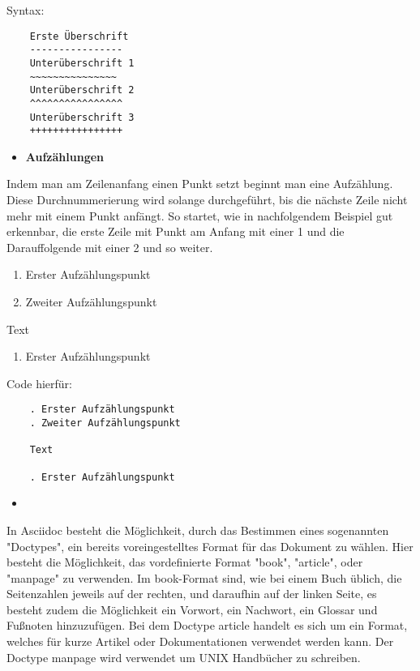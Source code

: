 \documentclass[11pt]{amsbook}
\begin{document}
Syntax:


\begin{verbatim}
    Erste Überschrift
    ----------------
    Unterüberschrift 1
    ~~~~~~~~~~~~~~~
    Unterüberschrift 2
    ^^^^^^^^^^^^^^^^
    Unterüberschrift 3
    ++++++++++++++++
\end{verbatim}

\begin{itemize}

\item \textbf{Aufzählungen}

\end{itemize}


Indem man am Zeilenanfang einen Punkt setzt beginnt man eine Aufzählung. Diese Durchnummerierung wird solange durchgeführt, bis die nächste Zeile nicht mehr mit einem Punkt anfängt. So startet, wie in nachfolgendem Beispiel gut erkennbar, die erste Zeile mit Punkt am Anfang mit einer 1 und die Darauffolgende mit einer 2 und so weiter.


\begin{enumerate}

\item{Erster Aufzählungspunkt}

\item{Zweiter Aufzählungspunkt}

\end{enumerate}


Text


\begin{enumerate}

\item{Erster Aufzählungspunkt}

\end{enumerate}


Code hierfür:


\begin{verbatim}
    . Erster Aufzählungspunkt
    . Zweiter Aufzählungspunkt

    Text

    . Erster Aufzählungspunkt
\end{verbatim}

\begin{itemize}

\item \textbfbook

\end{itemize}


In Asciidoc besteht die Möglichkeit, durch das Bestimmen eines sogenannten "Doctypes", ein bereits voreingestelltes Format für das Dokument zu wählen.
Hier besteht die Möglichkeit, das vordefinierte Format "book", "article", oder "manpage" zu verwenden. Im book-Format sind, wie bei einem Buch üblich, die Seitenzahlen jeweils auf der rechten, und daraufhin auf der linken Seite, es besteht zudem die Möglichkeit ein Vorwort, ein Nachwort, ein Glossar und Fußnoten hinzuzufügen.
Bei dem Doctype article handelt es sich um ein Format, welches für kurze Artikel oder Dokumentationen verwendet werden kann.
Der Doctype manpage wird verwendet um UNIX Handbücher zu schreiben.
\end{document}
